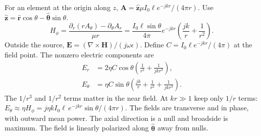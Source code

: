 \documentclass[12pt,a4paper]{article}
\begin{document}
For an element at the origin along $z$, $\mathbf A=\hat{\mathbf z}\mu I_0\ell e^{-jkr}/(4\pi r)$. Use $\hat{\mathbf z}=\hat{\mathbf r}\cos\theta-\hat{\boldsymbol\theta}\sin\theta$.
\[
H_\phi=\frac{\partial_r(r A_\theta)-\partial_\theta A_r}{\mu r}
  =\frac{I_0\ell\sin\theta}{4\pi}e^{-jkr}
   \left(\frac{jk}{r}+\frac{1}{r^2}\right).
\]
Outside the source, $\mathbf E=(\nabla\times\mathbf H)/(j\omega\epsilon)$. Define $C=I_0\ell e^{-jkr}/(4\pi)$ at the field point. The nonzero electric components are
\[
\begin{aligned}
E_r&=2\eta C\cos\theta\left(\frac{1}{r^2}+\frac{1}{jk r^3}\right),\\
E_\theta&=\eta C\sin\theta\left(\frac{jk}{r}+\frac{1}{r^2}+\frac{1}{jk r^3}\right).
\end{aligned}
\]
The $1/r^3$ and $1/r^2$ terms matter in the near field. At $kr\gg1$ keep only $1/r$ terms: $E_\theta\approx\eta H_\phi=j\eta k I_0\ell\,e^{-jkr}\sin\theta/(4\pi r)$. The fields are transverse and in phase, with outward mean power. The axial direction is a null and broadside is maximum. The field is linearly polarized along $\hat{\boldsymbol\theta}$ away from nulls.
\begin{tcolorbox}[tikzbox,title={Hertzian dipole and normalized elevation-plane power pattern},unbreakable]
\centering
{}
\end{tcolorbox}
\end{document}
